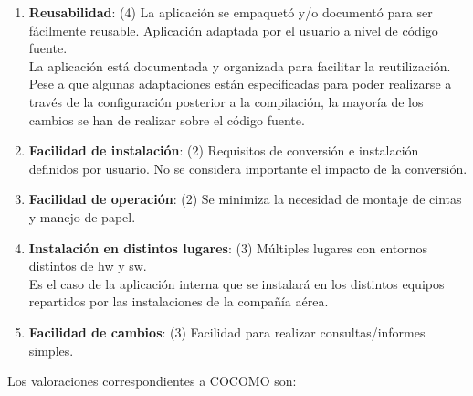 \documentclass[11pt, a4paper, twoside, titlepage]{article}
\begin{document}
\begin{enumerate}
					\item \textbf{Reusabilidad}: (4) La aplicación se empaquetó y/o documentó para ser fácilmente reusable. Aplicación adaptada por el usuario a nivel de código fuente.\\
						La aplicación está documentada y organizada para facilitar la reutilización. Pese a que algunas adaptaciones están especificadas para poder realizarse a través de la configuración posterior a la compilación, la mayoría de los cambios se han de realizar sobre el código fuente.
					\item \textbf{Facilidad de instalación}: (2) Requisitos de conversión e instalación definidos por usuario. No se considera importante el impacto de la conversión.
					\item \textbf{Facilidad de operación}: (2) Se minimiza la necesidad de montaje de cintas y manejo de papel.
					\item \textbf{Instalación en distintos lugares}: (3) Múltiples lugares con entornos distintos de hw y sw.\\
						Es el caso de la aplicación interna que se instalará en los distintos equipos repartidos por las instalaciones de la compañía aérea.
					\item \textbf{Facilidad de cambios}: (3) Facilidad para realizar consultas/informes simples.	
				\end{enumerate}

				Los valoraciones correspondientes a COCOMO son:
				
\end{document}
